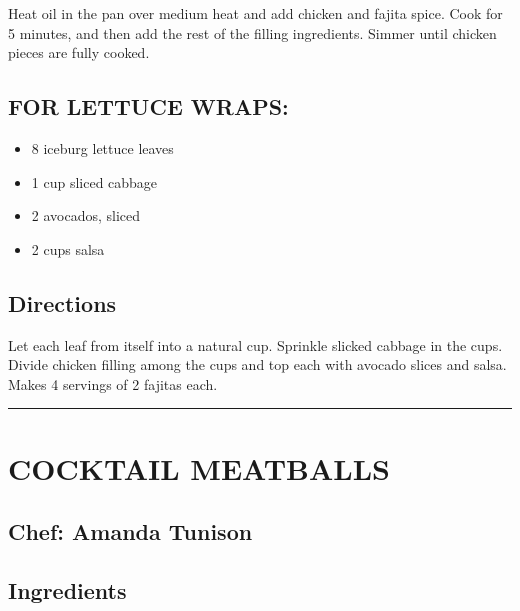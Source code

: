 \documentclass[
]{book}
\providecommand{\tightlist}{%
  \setlength{\itemsep}{0pt}\setlength{\parskip}{0pt}}
\begin{document}
Heat oil in the pan over medium heat and add chicken and fajita spice. Cook for 5 minutes, and then add the rest of the filling ingredients. Simmer until chicken pieces are fully cooked.

\hypertarget{for-lettuce-wraps}{%
\subsection*{FOR LETTUCE WRAPS:}\label{for-lettuce-wraps}}


\begin{itemize}
\tightlist
\item
  8 iceburg lettuce leaves
\item
  1 cup sliced cabbage
\item
  2 avocados, sliced
\item
  2 cups salsa
\end{itemize}

\hypertarget{directions-49}{%
\subsection*{Directions}\label{directions-49}}


Let each leaf from itself into a natural cup. Sprinkle slicked cabbage in the cups. Divide chicken filling among the cups and top each with avocado slices and salsa. Makes 4 servings of 2 fajitas each.

\begin{center}\rule{0.5\linewidth}{0.5pt}\end{center}

\hypertarget{cocktail-meatballs}{%
\section*{COCKTAIL MEATBALLS}\label{cocktail-meatballs}}


\hypertarget{chef-amanda-tunison}{%
\subsection*{Chef: Amanda Tunison}\label{chef-amanda-tunison}}


\hypertarget{ingredients-50}{%
\subsection*{Ingredients}\label{ingredients-50}}
\end{document}
